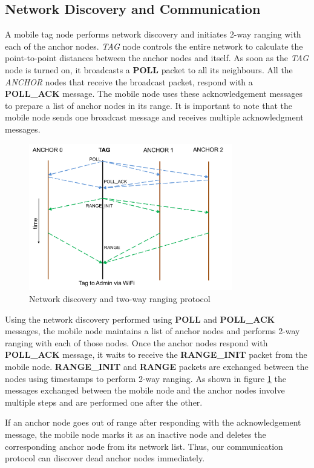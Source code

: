 \documentclass[journal,transmag]{IEEEtran}
\begin{document}
\subsection{Network Discovery and Communication}
A mobile tag node performs network discovery and initiates 2-way ranging with each of the anchor nodes. \textit{TAG} node controls the entire network to calculate the point-to-point distances between the anchor nodes and itself. As soon as the \textit{TAG} node is turned on, it broadcasts a \textbf{POLL} packet to all its neighbours. All the \textit{ANCHOR} nodes that receive the broadcast packet, respond with a \textbf{POLL\_ACK} message. The mobile node uses these acknowledgement messages to prepare a list of anchor nodes in its range. It is important to note that the mobile node sends one broadcast message and receives multiple acknowledgment messages.\\  
\begin{figure}[!h]
\centering
\includegraphics[width=3.5in]{communication.png}
\caption{{Network discovery and two-way ranging protocol}}
\label{commsystem}
\end{figure}
Using the network discovery performed using \textbf{POLL} and \textbf{POLL\_ACK} messages, the mobile node maintains a list of anchor nodes and performs 2-way ranging with each of those nodes. Once the anchor nodes respond with \textbf{POLL\_ACK} message, it waits to receive the \textbf{RANGE\_INIT} packet from the mobile node. \textbf{RANGE\_INIT} and \textbf{RANGE} packets are exchanged between the nodes using timestamps to perform 2-way ranging. As shown in figure \ref{commsystem} the messages exchanged between the mobile node and the anchor nodes involve multiple steps and are performed one after the other. 

If an anchor node goes out of range after responding with the acknowledgement message, the mobile node marks it as an inactive node and deletes the corresponding anchor node from its network list. Thus, our communication protocol can discover dead anchor nodes immediately.
\end{document}
